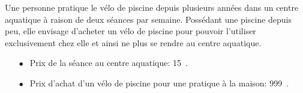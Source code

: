 \documentclass[10pt]{article}
\newcommand{\euro}{\eurologo{}}
\begin{document}
\setlength\parindent{0mm}
\pagestyle{fancy}
\thispagestyle{empty}
    
    
    




\medskip

Une personne pratique le vélo de piscine depuis plusieurs années dans un centre
aquatique à raison de deux séances par semaine. Possédant une piscine depuis peu,
elle envisage d'acheter un vélo de piscine pour pouvoir l'utiliser exclusivement chez
elle et ainsi ne plus se rendre au centre aquatique.

\medskip

\setlength\parindent{6mm}
\begin{itemize}
\item[$\bullet~~$] Prix de la séance au centre aquatique: 15~\euro.
\item[$\bullet~~$] Prix d'achat d'un vélo de piscine pour une pratique à la maison: 999~\euro.
\end{itemize}
\setlength\parindent{0mm}

\medskip
\end{document}
